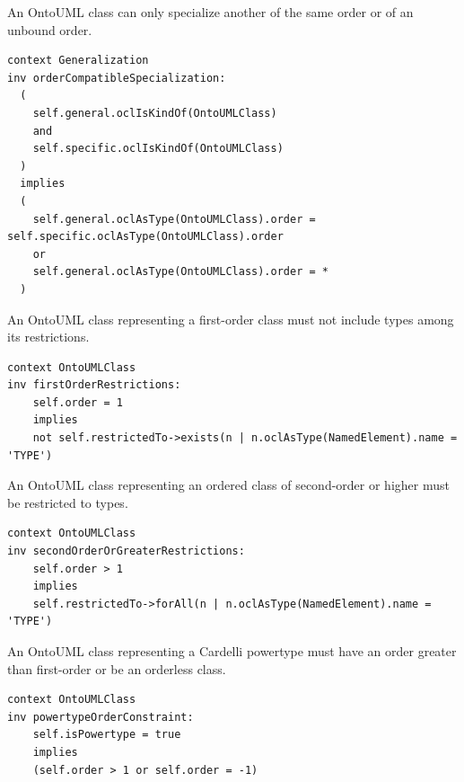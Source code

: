 \begin{constraint}
\label{constraint:orderCompatibleSpecialization}
An OntoUML class can only specialize another of the same order or of an unbound order.

\begin{lstlisting}[language=OCL]
context Generalization
inv orderCompatibleSpecialization:
  (
    self.general.oclIsKindOf(OntoUMLClass)
    and
    self.specific.oclIsKindOf(OntoUMLClass)
  )
  implies
  (
    self.general.oclAsType(OntoUMLClass).order = self.specific.oclAsType(OntoUMLClass).order
    or
    self.general.oclAsType(OntoUMLClass).order = *
  )
\end{lstlisting}
\end{constraint}

\begin{constraint}
\label{constraint:firstOrderRestrictions}
An OntoUML class representing a first-order class must not include types among its restrictions.

\begin{lstlisting}[language=OCL]
context OntoUMLClass
inv firstOrderRestrictions:
    self.order = 1
    implies
    not self.restrictedTo->exists(n | n.oclAsType(NamedElement).name = 'TYPE')
\end{lstlisting}
\end{constraint}

\begin{constraint}
\label{constraint:secondOrderOrGreaterRestrictions}
An OntoUML class representing an ordered class of second-order or higher must be restricted to types.

\begin{lstlisting}[language=OCL]
context OntoUMLClass
inv secondOrderOrGreaterRestrictions:
    self.order > 1
    implies
    self.restrictedTo->forAll(n | n.oclAsType(NamedElement).name = 'TYPE')
\end{lstlisting}
\end{constraint}

\begin{constraint}
\label{constraint:powertypeOrderConstraint}
An OntoUML class representing a Cardelli powertype must have an order greater than first-order or be an orderless class.

\begin{lstlisting}[language=OCL]
context OntoUMLClass
inv powertypeOrderConstraint:
    self.isPowertype = true
    implies
    (self.order > 1 or self.order = -1)
\end{lstlisting}
\end{constraint}

